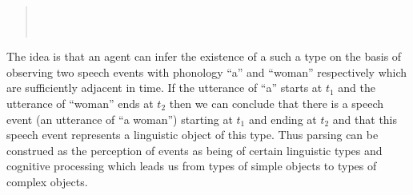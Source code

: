 \begin{quote}
{{{                                                              \\
                                                              \\
                                                             }}}
\end{quote}

The idea is that an agent can infer the existence of a such a type on
the basis of observing two speech events with phonology ``a'' and
``woman'' respectively which are sufficiently adjacent in time.  If
the utterance of ``a'' starts at $t_1$ and the utterance of ``woman''
ends at $t_2$ then we can conclude that there is a speech event (an
utterance of ``a woman'') starting at $t_1$ and ending at $t_2$ and
that this speech event represents a linguistic object of this type.
Thus parsing can be construed as the perception of events as being of
certain linguistic types and cognitive processing which leads us from
types of simple objects to types of complex objects.

